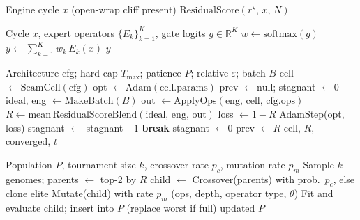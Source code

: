 \begin{algorithm}[H]
\caption{No-bake (passthrough) control}
\label{alg:no-bake}
\begin{algorithmic}[1]
\Require Engine cycle $x$ (open-wrap cliff present)
\State \Return $\mathrm{ResidualScore}(r^{\star},\,x,\,N)$ 
\end{algorithmic}
\end{algorithm}
\FloatBarrier

\begin{algorithm}[H]
\caption{MoE soft gating over bake experts}
\label{alg:moe}
\begin{algorithmic}[1]
\Require Cycle $x$, expert operators $\{E_k\}_{k=1}^{K}$, gate logits $g\in\mathbb{R}^{K}$
\State $w \gets \mathrm{softmax}(g)$
\State $y \gets \sum_{k=1}^{K} w_k\, E_k(x)$
\State \Return $y$
\end{algorithmic}
\end{algorithm}
\FloatBarrier

\begin{algorithm}[H]
\caption{FitCell (inner loop; converge protocol)}
\label{alg:fit}
\begin{algorithmic}[1]
\Require Architecture cfg; hard cap $T_{\max}$; patience $P$; relative $\varepsilon$; batch $B$
\State cell $\gets \mathrm{SeamCell}(\mathrm{cfg})$
\State opt $\gets \mathrm{Adam}(\mathrm{cell.params})$
\State prev $\gets \mathrm{null}$; stagnant $\gets 0$
  \State ideal, eng $\gets \mathrm{MakeBatch}(B)$
  \State out $\gets \mathrm{ApplyOps}(\mathrm{eng},\,\mathrm{cell},\,\mathrm{cfg.ops})$
  \State $R \gets \mathrm{mean}\,\mathrm{ResidualScoreBlend}(\mathrm{ideal},\,\mathrm{eng},\,\mathrm{out})$
  \State loss $\gets 1-R$
    \State AdamStep(opt, loss)
  \EndIf
    \State stagnant $\gets$ stagnant $+1$
      \State \textbf{break} 
    \EndIf
  \Else
    \State stagnant $\gets 0$
  \EndIf
  \State prev $\gets R$
\EndFor
\State \Return cell, $R$, converged, $t$
\end{algorithmic}
\end{algorithm}
\FloatBarrier

\begin{algorithm}[H]
\caption{GA tournament step}
\label{alg:ga}
\begin{algorithmic}[1]
\Require Population $P$, tournament size $k$, crossover rate $p_c$, mutation rate $p_m$
\State Sample $k$ genomes; parents $\gets$ top-2 by $R$
\State child $\gets$ Crossover(parents) with prob.\ $p_c$, else clone elite
\State Mutate(child) with rate $p_m$ (ops, depth, operator type, $\theta$)
\State Fit and evaluate child; insert into $P$ (replace worst if full)
\State \Return updated $P$
\end{algorithmic}
\end{algorithm}
\FloatBarrier

